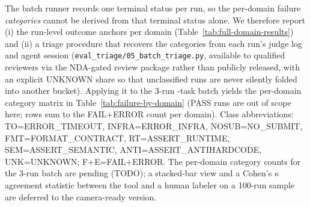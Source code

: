 {\sloppy
The batch runner records one terminal status per run, so the per-domain failure
\emph{categories} cannot be derived from that terminal status alone. We therefore
report (i) the run-level outcome anchors per domain (Table~\ref{tab:full-domain-results})
and (ii) a triage procedure that recovers the categories from each run's judge log and
agent session (\texttt{eval\_triage/05\_batch\_triage.py}, available to qualified reviewers
via the NDA-gated review package rather than publicly released, with an explicit UNKNOWN
share so that unclassified runs are never silently folded into another bucket). Applying it to
the 3-run \Ncases{}-task batch yields the per-domain category matrix in
Table~\ref{tab:failure-by-domain} (PASS runs are out of scope here; rows sum to
the FAIL+ERROR count per domain). Class abbreviations: TO=ERROR\_TIMEOUT,
INFRA=ERROR\_INFRA, NOSUB=NO\_SUBMIT, FMT=FORMAT\_CONTRACT, RT=ASSERT\_RUNTIME,
SEM=ASSERT\_SEMANTIC, ANTI=ASSERT\_ANTIHARDCODE, UNK=UNKNOWN; F+E=FAIL+ERROR.
The per-domain category counts for the 3-run batch are pending (TODO); a stacked-bar view and a Cohen's $\kappa$ agreement
statistic between the tool and a human labeler on a 100-run sample are deferred
to the camera-ready version.
\par}


